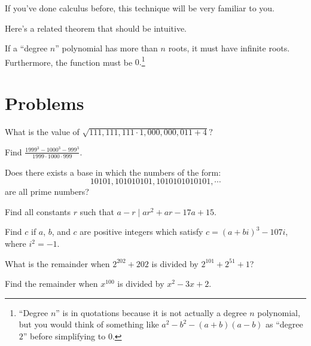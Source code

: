 \documentclass[mast]{lucky}
\begin{document}
If you've done calculus before, this technique will be very familiar to you.

Here's a related theorem that should be intuitive.

\begin{fact}
If a ``degree $n$'' polynomial has more than $n$ roots, it must have infinite roots. Furthermore, the function must be $0.$\footnote{``Degree $n$'' is in quotations because it is not actually a degree $n$ polynomial, but you would think of something like $a^2-b^2-(a+b)(a-b)$ as ``degree $2$'' before simplifying to $0.$}
\end{fact}

\pagebreak

\section{Problems}



\begin{prob}[MATHCOUNTS 2020]{1}
What is the value of $\sqrt{111,111,111\cdot 1,000,000,011+4}?$
\end{prob}

\begin{prob}[]{2}
Find $\frac{1999^3-1000^3-999^3}{1999\cdot 1000\cdot 999}.$
\end{prob}

\begin{prob}[PAMO 2003/3]{2}
Does there exists a base in which the numbers of the form:
\[ 10101, 101010101, 1010101010101,\cdots \]
are all prime numbers?
\end{prob}

\begin{prob}[]{2}
Find all constants $r$ such that $a-r\mid ar^2+ar-17a+15.$
\end{prob}

\begin{prob}[AIME 1985/3]{2}
Find $c$ if $a$, $b$, and $c$ are positive integers which satisfy $c=(a + bi)^3 - 107i$, where $i^2 = -1$.
\end{prob}
    
\begin{req}[AMC 10B 2020/22]{2}
What is the remainder when $2^{202}+202$ is divided by $2^{101}+2^{51}+1$?
\end{req}

\begin{prob}[AHSME 1969/34]{2}
Find the remainder when $x^{100}$ is divided by $x^2-3x+2.$
\end{prob}
\end{document}
